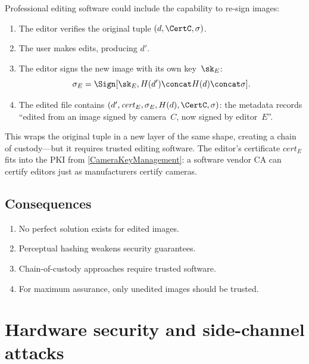 Professional editing software could include the capability to re-sign
images:
\begin{enumerate}
  \item The editor verifies the original tuple \((d, \CertC, \sigma)\).
  \item The user makes edits, producing \(d'\).
  \item The editor signs the new image with its own key~\(\sk_E\):
    \[
      \sigma_E = \Sign[\sk_E, H(d') \concat H(d) \concat \sigma].
    \]
  \item The edited file contains \((d', \mathit{cert}_E, \sigma_E,
    H(d), \CertC, \sigma)\): the metadata records \enquote{edited from an
    image signed by camera~\(C\), now signed by editor~\(E\)}.
\end{enumerate}

This wraps the original tuple in a new layer of the same shape, creating a
chain of custody---but it requires trusted editing software.
The editor's certificate \(\mathit{cert}_E\) fits into the \ac{PKI} from
\cref{CameraKeyManagement}: a software vendor \ac{CA} can certify editors
just as manufacturers certify cameras.

\subsection{Consequences}

\begin{enumerate}
  \item No perfect solution exists for edited images.
  \item Perceptual hashing weakens security guarantees.
  \item Chain-of-custody approaches require trusted software.
  \item For maximum assurance, only unedited images should be trusted.
\end{enumerate}


\section{Hardware security and side-channel
attacks}\label{CameraHardwareSecurity}


